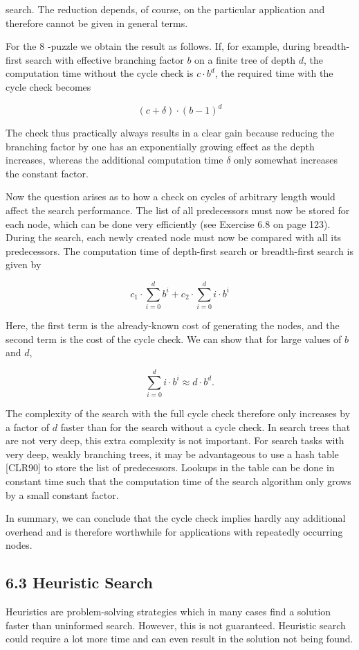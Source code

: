 \documentclass[10pt]{article}
\begin{document}
search. The reduction depends, of course, on the particular application and therefore cannot be given in general terms.


For the 8 -puzzle we obtain the result as follows. If, for example, during breadth-first search with effective branching factor $b$ on a finite tree of depth $d$, the computation time without the cycle check is $c \cdot b^{d}$, the required time with the cycle check becomes

$$
(c+\delta) \cdot(b-1)^{d}
$$

The check thus practically always results in a clear gain because reducing the branching factor by one has an exponentially growing effect as the depth increases, whereas the additional computation time $\delta$ only somewhat increases the constant factor.

Now the question arises as to how a check on cycles of arbitrary length would affect the search performance. The list of all predecessors must now be stored for each node, which can be done very efficiently (see Exercise 6.8 on page 123). During the search, each newly created node must now be compared with all its predecessors. The computation time of depth-first search or breadth-first search is given by

$$
c_{1} \cdot \sum_{i=0}^{d} b^{i}+c_{2} \cdot \sum_{i=0}^{d} i \cdot b^{i}
$$

Here, the first term is the already-known cost of generating the nodes, and the second term is the cost of the cycle check. We can show that for large values of $b$ and $d$,

$$
\sum_{i=0}^{d} i \cdot b^{i} \approx d \cdot b^{d} .
$$

The complexity of the search with the full cycle check therefore only increases by a factor of $d$ faster than for the search without a cycle check. In search trees that are not very deep, this extra complexity is not important. For search tasks with very deep, weakly branching trees, it may be advantageous to use a hash table [CLR90] to store the list of predecessors. Lookups in the table can be done in constant time such that the computation time of the search algorithm only grows by a small constant factor.

In summary, we can conclude that the cycle check implies hardly any additional overhead and is therefore worthwhile for applications with repeatedly occurring nodes.

\subsection*{6.3 Heuristic Search}
Heuristics are problem-solving strategies which in many cases find a solution faster than uninformed search. However, this is not guaranteed. Heuristic search could require a lot more time and can even result in the solution not being found.
\end{document}
